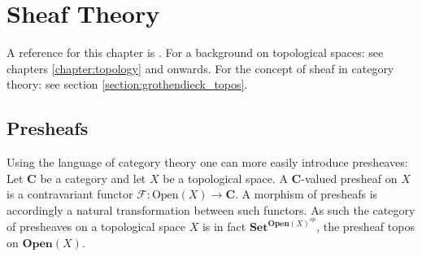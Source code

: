 \chapter{Sheaf Theory}\label{chapter:sheaf}

    A reference for this chapter is \cite{brylinski}. For a background on topological spaces: see chapters \ref{chapter:topology} and onwards. For the concept of sheaf in category theory: see section \ref{section:grothendieck_topos}.

\section{Presheafs}



    \begin{adefinition}
        Using the language of category theory one can more easily introduce presheaves: Let $\mathbf{C}$ be a category and let $X$ be a topological space. A $\mathbf{C}$-valued presheaf on $X$ is a contravariant functor $\mathcal{F}:\text{Open}(X)\rightarrow\mathbf{C}$. A morphism of presheafs is accordingly a natural transformation between such functors. As such the category of presheaves on a topological space $X$ is in fact $\textbf{Set}^{\textbf{Open}(X)^{op}}$, the presheaf topos on $\textbf{Open}(X)$.
    \end{adefinition}

